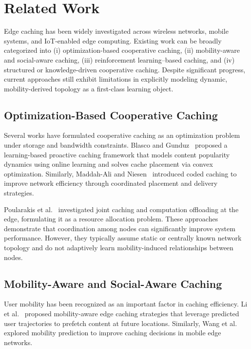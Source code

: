 \section{Related Work}

Edge caching has been widely investigated across wireless networks, mobile systems, and IoT-enabled edge computing. Existing work can be broadly categorized into (i) optimization-based cooperative caching, (ii) mobility-aware and social-aware caching, (iii) reinforcement learning–based caching, and (iv) structured or knowledge-driven cooperative caching. Despite significant progress, current approaches still exhibit limitations in explicitly modeling dynamic, mobility-derived topology as a first-class learning object.

\subsection{Optimization-Based Cooperative Caching}

Several works have formulated cooperative caching as an optimization problem under storage and bandwidth constraints. Blasco and Gunduz~\cite{Blasco2014} proposed a learning-based proactive caching framework that models content popularity dynamics using online learning and solves cache placement via convex optimization. Similarly, Maddah-Ali and Niesen~\cite{MaddahAli2014} introduced coded caching to improve network efficiency through coordinated placement and delivery strategies.

Poularakis et al.~\cite{Poularakis2016} investigated joint caching and computation offloading at the edge, formulating it as a resource allocation problem. These approaches demonstrate that coordination among nodes can significantly improve system performance. However, they typically assume static or centrally known network topology and do not adaptively learn mobility-induced relationships between nodes.

\subsection{Mobility-Aware and Social-Aware Caching}

User mobility has been recognized as an important factor in caching efficiency. Li et al.~\cite{Li2018Mobility} proposed mobility-aware edge caching strategies that leverage predicted user trajectories to prefetch content at future locations. Similarly, Wang et al.~\cite{Wang2017Mobility} explored mobility prediction to improve caching decisions in mobile edge networks.

